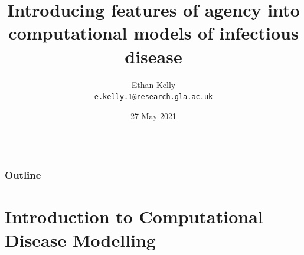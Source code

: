 \documentclass[unknownkeysallowed]{beamer}
\title[Agency in disease modelling]{Introducing features of agency into computational models of infectious disease}
\author{Ethan Kelly\\ \texttt{e.kelly.1@research.gla.ac.uk}}
\date{27 May 2021}
\begin{document}
{

  \begin{frame}[plain]

    \begin{columns}

      \begin{column}[l]{3cm}
      \end{column}

      \begin{column}[r]{7cm}
        \titlepage
      \end{column}

    \end{columns}
  \end{frame}
}

\begin{frame}
  \frametitle{Outline}
  \tableofcontents
\end{frame}

\section{Introduction to Computational Disease Modelling}

\end{document}
